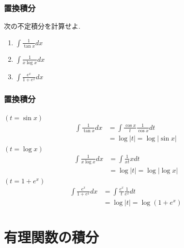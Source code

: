 


\begin{frame}
\frametitle{置換積分}

\begin{Prob}
次の不定積分を計算せよ. 
\begin{enumerate}
\item $\int \frac{1}{\tan x} dx$
\item $\int \frac{1}{x \log x}dx$
\item $\int \frac{e^x}{1+e^x} dx$
\end{enumerate}
\end{Prob}

\end{frame}






\begin{frame}
\frametitle{置換積分}

$(t=\sin x)$
\begin{align*}
\int \frac{1}{\tan x} dx & = \int \frac{\cos x}{t}\frac{1}{\cos x} dt \\
& = \log|t| = \log|\sin x|
\end{align*}
$(t=\log x)$
\begin{align*}
\int \frac{1}{x \log x}dx & = \int \frac{1}{x t} xdt \\
& = \log|t| = \log|\log x|
\end{align*}
$(t=1+e^x)$
\begin{align*}
\int \frac{e^x}{1+e^x} dx & = \int \frac{e^x}{t} \frac{1}{e^x}dt \\
& = \log|t| = \log(1+e^x)
\end{align*}

\end{frame}






\section{有理関数の積分}

